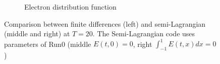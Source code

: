 \documentclass{article}
\numberwithin{equation}{section}
\newcommand{\mysubcaption}[1]{
	\vspace*{5pt}
	\begin{minipage}{0.8\linewidth}
		\begin{center}
			\footnotesize\emph{#1}
		\end{center}
	\end{minipage}
}
\newcommand{\imh}{\textheight} %
\begin{document}
\begin{figure}
\begin{subfigure}{\textwidth}
		\caption{Electron distribution function}
		\label{subfig:compT02_electron}
	\end{subfigure}
	\caption{Comparison between finite differences (left) and semi-Lagrangian  (middle and right) at $T=20$. The Semi-Lagrangian code uses parameters of Run0 (middle $E(t,0)=0$, right $\int_{-1}^1E(t,x)dx=0$)
	}
	\label{fig:compT20}
\end{figure}  

%	
%	
%	
\end{document}
